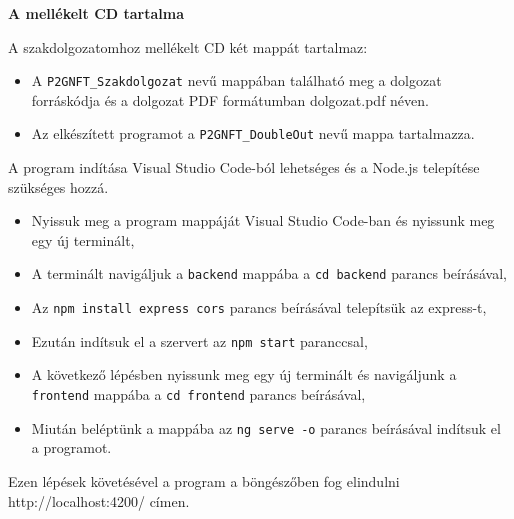 \pagestyle{empty}

\noindent \textbf{\Large A mellékelt CD tartalma}

\vskip 1cm

A szakdolgozatomhoz mellékelt CD két mappát tartalmaz:

\begin{itemize}
\item A \texttt{P2GNFT_Szakdolgozat} nevű mappában található meg a dolgozat forráskódja és a dolgozat PDF formátumban dolgozat.pdf néven.
\item Az elkészített programot a \texttt{P2GNFT_DoubleOut} nevű mappa tartalmazza.
\end{itemize}

A program indítása Visual Studio Code-ból lehetséges és a Node.js telepítése szükséges hozzá.

\begin{itemize}
\item Nyissuk meg a program mappáját Visual Studio Code-ban és nyissunk meg egy új terminált,
\item A terminált navigáljuk a \texttt{backend} mappába a \texttt{cd backend} parancs beírásával,
\item Az \texttt{npm install express cors} parancs beírásával telepítsük az express-t,
\item Ezután indítsuk el a szervert az \texttt{npm start} paranccsal,
\item A következő lépésben nyissunk meg egy új terminált és navigáljunk a \texttt{frontend} mappába a \texttt{cd frontend} parancs beírásával,
\item Miután beléptünk a mappába az \texttt{ng serve -o} parancs beírásával indítsuk el a programot. 
\end{itemize}

Ezen lépések követésével a program a böngészőben fog elindulni http://localhost:4200/ címen.